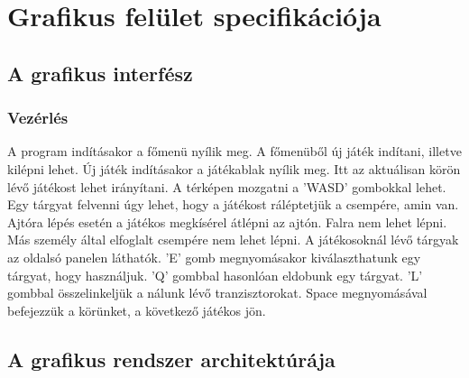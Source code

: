 \chapter{Grafikus felület specifikációja}

\section{A grafikus interfész}


\subsection{Vezérlés}
A program indításakor a főmenü nyílik meg. A főmenüből új játék indítani, illetve kilépni lehet. Új játék indításakor a játékablak nyílik meg.
\newline Itt az aktuálisan körön lévő játékost lehet irányítani. A térképen mozgatni a 'WASD' gombokkal lehet. Egy tárgyat felvenni úgy lehet, hogy a játékost ráléptetjük a csempére, amin van. Ajtóra lépés esetén a játékos megkísérel átlépni az ajtón. Falra nem lehet lépni. Más személy által elfoglalt csempére nem lehet lépni.
\newline A játékosoknál lévő tárgyak az oldalsó panelen láthatók. 'E' gomb megnyomásakor kiválaszthatunk egy tárgyat, hogy használjuk. 'Q' gombbal hasonlóan eldobunk egy tárgyat. 'L' gombbal összelinkeljük a nálunk lévő tranzisztorokat. Space megnyomásával befejezzük a körünket, a következő játékos jön.

\section{A grafikus rendszer architektúrája}

